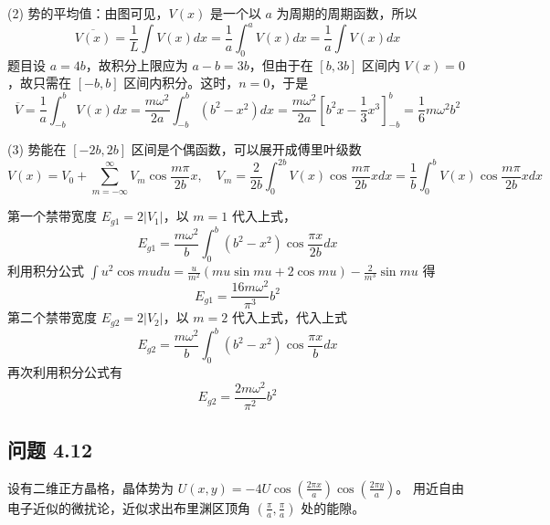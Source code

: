 \documentclass[12pt, a4paper]{article}
\begin{document}
(2) 势的平均值：由图可见，\(V(x)\) 是一个以 \(a\) 为周期的周期函数，所以
\[
\overline{V(x)} = \frac{1}{L} \int V(x) dx = \frac{1}{a} \int_0^a V(x) dx = \frac{1}{a} \int V(x) dx
\]
题目设 \(a = 4b\)，故积分上限应为 \(a - b = 3b\)，但由于在 \([b, 3b]\) 区间内 \(V(x) = 0\)，故只需在 \([-b, b]\) 区间内积分。这时，\(n = 0\)，于是
\[
\overline{V} = \frac{1}{a} \int_{-b}^b V(x) dx = \frac{m\omega^2}{2a} \int_{-b}^b (b^2 - x^2) dx = \frac{m\omega^2}{2a} \left[ b^2 x - \frac{1}{3} x^3 \right]_{-b}^b = \frac{1}{6} m\omega^2 b^2
\]

(3) 势能在 \([-2b, 2b]\) 区间是个偶函数，可以展开成傅里叶级数
\[
V(x) = V_0 + \sum_{m = -\infty}^{\infty} V_m \cos \frac{m\pi}{2b} x, \quad V_m = \frac{2}{2b} \int_0^{2b} V(x) \cos \frac{m\pi}{2b} x dx = \frac{1}{b} \int_0^b V(x) \cos \frac{m\pi}{2b} x dx
\]

第一个禁带宽度 \(E_{g1} = 2|V_1|\)，以 \(m = 1\) 代入上式，
\[
E_{g1} = \frac{m\omega^2}{b} \int_0^b (b^2 - x^2) \cos \frac{\pi x}{2b} dx
\]
利用积分公式 \(\int u^2 \cos mu du = \frac{u}{m^2} (mu \sin mu + 2 \cos mu) - \frac{2}{m^3} \sin mu\) 得
\[
E_{g1} = \frac{16 m\omega^2}{\pi^3} b^2
\]
第二个禁带宽度 \(E_{g2} = 2|V_2|\)，以 \(m = 2\) 代入上式，代入上式
\[
E_{g2} = \frac{m\omega^2}{b} \int_0^b (b^2 - x^2) \cos \frac{\pi x}{b} dx
\]
再次利用积分公式有
\[
E_{g2} = \frac{2 m\omega^2}{\pi^2} b^2
\]

\subsection*{问题 4.12}
设有二维正方晶格，晶体势为 \(U(x,y) = -4U \cos\left(\frac{2\pi x}{a}\right) \cos\left(\frac{2\pi y}{a}\right)\)。
用近自由电子近似的微扰论，近似求出布里渊区顶角 \((\frac{\pi}{a}, \frac{\pi}{a})\) 处的能隙。
\end{document}
